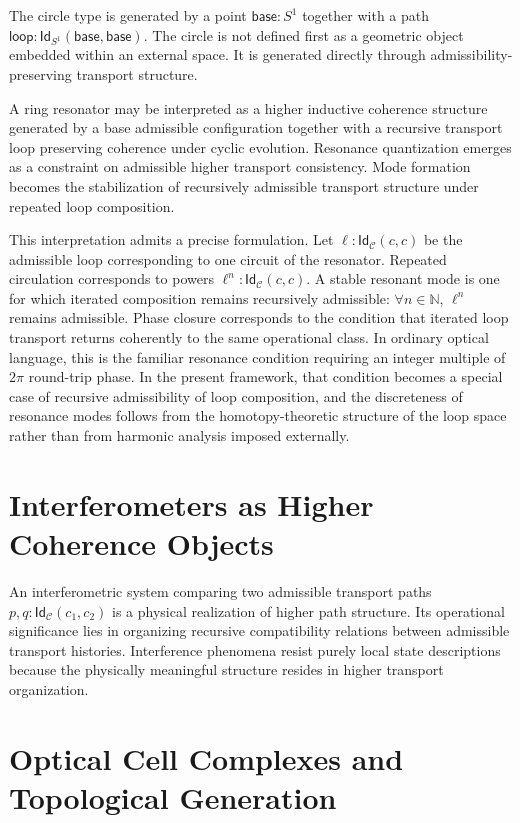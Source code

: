 \documentclass[11pt,openany]{book}
\theoremstyle{definition}
\theoremstyle{plain}
\newcommand{\idtype}{\mathsf{Id}}
\begin{document}
The circle type is generated by a point $\mathsf{base} : S^1$ together with a path $\mathsf{loop} : \idtype_{S^1}(\mathsf{base},\mathsf{base})$. The circle is not defined first as a geometric object embedded within an external space. It is generated directly through admissibility-preserving transport structure.

A ring resonator may be interpreted as a higher inductive coherence structure generated by a base admissible configuration together with a recursive transport loop preserving coherence under cyclic evolution. Resonance quantization emerges as a constraint on admissible higher transport consistency. Mode formation becomes the stabilization of recursively admissible transport structure under repeated loop composition.

This interpretation admits a precise formulation. Let $\ell : \idtype_{\mathcal{C}}(c,c)$ be the admissible loop corresponding to one circuit of the resonator. Repeated circulation corresponds to powers $\ell^n : \idtype_{\mathcal{C}}(c,c)$. A stable resonant mode is one for which iterated composition remains recursively admissible: $\forall n \in \mathbb{N}$, $\ell^n$ remains admissible. Phase closure corresponds to the condition that iterated loop transport returns coherently to the same operational class. In ordinary optical language, this is the familiar resonance condition requiring an integer multiple of $2\pi$ round-trip phase. In the present framework, that condition becomes a special case of recursive admissibility of loop composition, and the discreteness of resonance modes follows from the homotopy-theoretic structure of the loop space rather than from harmonic analysis imposed externally.

\section{Interferometers as Higher Coherence Objects}

An interferometric system comparing two admissible transport paths $p, q : \idtype_{\mathcal{C}}(c_1,c_2)$ is a physical realization of higher path structure. Its operational significance lies in organizing recursive compatibility relations between admissible transport histories. Interference phenomena resist purely local state descriptions because the physically meaningful structure resides in higher transport organization.

\section{Optical Cell Complexes and Topological Generation}
\end{document}
